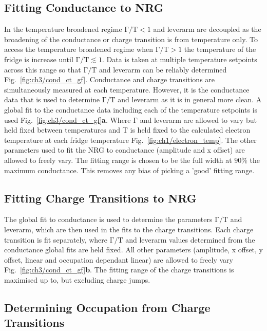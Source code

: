 \subsection{Fitting Conductance to NRG}
In the temperature broadened regime $\mathrm{\Gamma/T} < 1$ and leverarm are decoupled as the broadening of the conductance or charge transition is from temperature only. To access the temperature broadened regime when $\mathrm{\Gamma/T} > 1$ the temperature of the fridge is increase until $\mathrm{\Gamma/T} \lesssim 1$. Data is taken at multiple temperature setpoints across this range so that  $\mathrm{\Gamma/T}$ and leverarm can be reliably determined Fig.~\ref{fig:ch3/cond_ct_gf}. Conductance and charge transitions are simultaneously measured at each temperature. However, it is the conductance data that is used to determine $\mathrm{\Gamma/T}$ and leverarm as it is in general more clean. A global fit to the conductance data including each of the temperature setpoints is used Fig.~\ref{fig:ch3/cond_ct_gf}\textbf{a}. Where $\mathrm{\Gamma}$ and leverarm are allowed to vary but held fixed between temperatures and $\mathrm{T}$ is held fixed to the calculated electron temperature at each fridge temperature Fig.~\ref{fig:ch1/electron_temp}. The other parameters used to fit the NRG to conductance (amplitude and x offset) are allowed to freely vary.
The fitting range is chosen to be the full width at $90\%$ the maximum conductance. This removes any bias of picking a 'good' fitting range. 

\subsection{Fitting Charge Transitions to NRG}
The global fit to conductance is used to determine the parameters $\mathrm{\Gamma/T}$ and leverarm, which are then used in the fits to the charge transitions. Each charge transition is fit separately, where $\mathrm{\Gamma/T}$ and leverarm values determined from the conductance global fits are held fixed. All other parameters (amplitude, x offset, y offset, linear and occupation dependant linear) are allowed to freely vary Fig.~\ref{fig:ch3/cond_ct_gf}\textbf{b}. The fitting range of the charge transitions is maximised up to, but excluding charge jumps.


\subsection{Determining Occupation from Charge Transitions}

